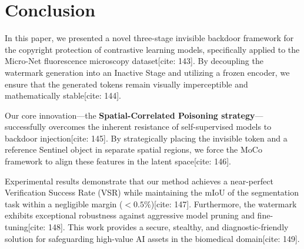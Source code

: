 \documentclass[10pt,twocolumn,letterpaper]{article}
\begin{document}
\section{Conclusion}
In this paper, we presented a novel three-stage invisible backdoor framework for the copyright protection of contrastive learning models, specifically applied to the Micro-Net fluorescence microscopy dataset[cite: 143]. By decoupling the watermark generation into an Inactive Stage and utilizing a frozen encoder, we ensure that the generated tokens remain visually imperceptible and mathematically stable[cite: 144]. 

Our core innovation—the \textbf{Spatial-Correlated Poisoning strategy}—successfully overcomes the inherent resistance of self-supervised models to backdoor injection[cite: 145]. By strategically placing the invisible token and a reference Sentinel object in separate spatial regions, we force the MoCo framework to align these features in the latent space[cite: 146]. 

Experimental results demonstrate that our method achieves a near-perfect Verification Success Rate (VSR) while maintaining the mIoU of the segmentation task within a negligible margin ($<0.5\%$)[cite: 147]. Furthermore, the watermark exhibits exceptional robustness against aggressive model pruning and fine-tuning[cite: 148]. This work provides a secure, stealthy, and diagnostic-friendly solution for safeguarding high-value AI assets in the biomedical domain[cite: 149].

\end{document}
